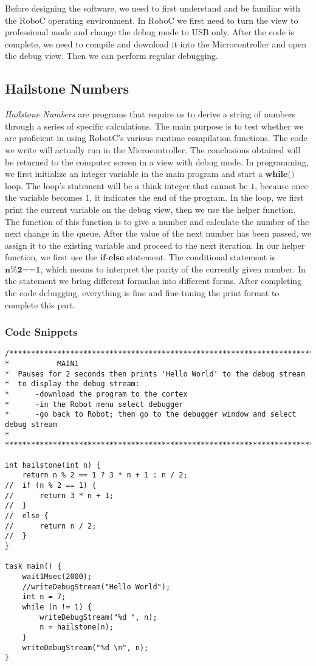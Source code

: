 \documentclass[12pt]{report}
\begin{document}
Before designing the software, we need to first understand and be familiar with the RoboC operating environment. In RoboC we first need to turn the view to professional mode and change the debug mode to USB only. After the code is complete, we need to compile and download it into the Microcontroller and open the debug view. Then we can perform regular debugging.

\subsection{Hailstone Numbers}

\textit{Hailstone Numbers} are programs that require us to derive a string of numbers through a series of specific calculations. The main purpose is to test whether we are proficient in using RobotC's various runtime compilation functions. The code we write will actually run in the Microcontroller. The conclusions obtained will be returned to the computer screen in a view with debug mode. In programming, we first initialize an integer variable in the main program and start a $\mathtt{\textbf{while()}}$ loop. The loop's statement will be a think integer that cannot be $1$, because once the variable becomes $1$, it indicates the end of the program. In the loop, we first print the current variable on the debug view, then we use the helper function. The function of this function is to give a number and calculate the number of the next change in the queue. After the value of the next number has been passed, we assign it to the existing variable and proceed to the next iteration. In our helper function, we first use the $\mathtt{\textbf{if-else}}$ statement. The conditional statement is $\mathtt{\textbf{n\%2==1}}$, which means to interpret the parity of the currently given number. In the statement we bring different formulas into different forms. After completing the code debugging, everything is fine and fine-tuning the print format to complete this part.

\subsubsection{Code Snippets}
\lstset{language=C}
\begin{lstlisting}
/**************************************************************************
*           MAIN1
*  Pauses for 2 seconds then prints 'Hello World' to the debug stream
*  to display the debug stream:
*      -download the program to the cortex
*      -in the Robot menu select debugger
*      -go back to Robot; then go to the debugger window and select debug stream
*
***************************************************************************/

int hailstone(int n) {
	return n % 2 == 1 ? 3 * n + 1 : n / 2;
//	if (n % 2 == 1) {
//		return 3 * n + 1;
//	}
//	else {
//		return n / 2;
//	}
}

task main() {
	wait1Msec(2000);
	//writeDebugStream("Hello World");
	int n = 7;
	while (n != 1) {
		writeDebugStream("%d ", n);
		n = hailstone(n);
	}
	writeDebugStream("%d \n", n);
}
\end{lstlisting}
\end{document}
